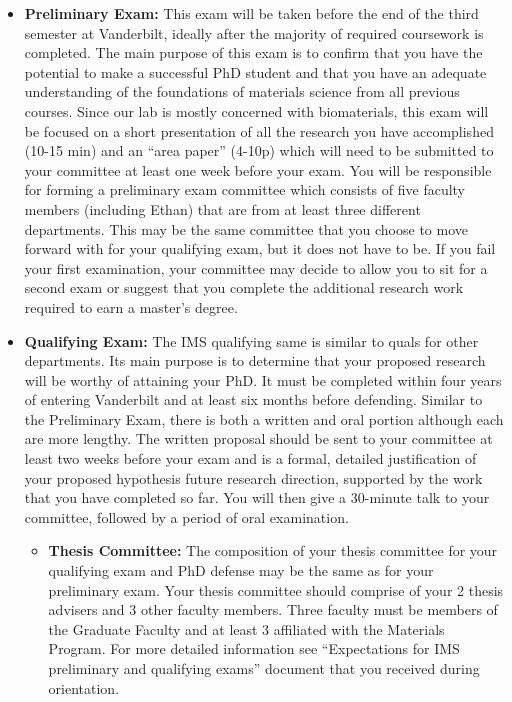 \documentclass[
]{book}
\providecommand{\tightlist}{%
  \setlength{\itemsep}{0pt}\setlength{\parskip}{0pt}}
\begin{document}
\begin{itemize}
\item
  \textbf{Preliminary Exam:} This exam will be taken before the end of the third semester at Vanderbilt, ideally after the majority of required coursework is completed. The main purpose of this exam is to confirm that you have the potential to make a successful PhD student and that you have an adequate understanding of the foundations of materials science from all previous courses. Since our lab is mostly concerned with biomaterials, this exam will be focused on a short presentation of all the research you have accomplished (10-15 min) and an ``area paper'' (4-10p) which will need to be submitted to your committee at least one week before your exam. You will be responsible for forming a preliminary exam committee which consists of five faculty members (including Ethan) that are from at least three different departments. This may be the same committee that you choose to move forward with for your qualifying exam, but it does not have to be. If you fail your first examination, your committee may decide to allow you to sit for a second exam or suggest that you complete the additional research work required to earn a master's degree.
\item
  \textbf{Qualifying Exam:} The IMS qualifying same is similar to quals for other departments. Its main purpose is to determine that your proposed research will be worthy of attaining your PhD. It must be completed within four years of entering Vanderbilt and at least six months before defending. Similar to the Preliminary Exam, there is both a written and oral portion although each are more lengthy. The written proposal should be sent to your committee at least two weeks before your exam and is a formal, detailed justification of your proposed hypothesis future research direction, supported by the work that you have completed so far. You will then give a 30-minute talk to your committee, followed by a period of oral examination.

  \begin{itemize}
  \tightlist
  \item
    \textbf{Thesis Committee:} The composition of your thesis committee for your qualifying exam and PhD defense may be the same as for your preliminary exam. Your thesis committee should comprise of your 2 thesis advisers and 3 other faculty members. Three faculty must be members of the Graduate Faculty and at least 3 affiliated with the Materials Program. For more detailed information see ``Expectations for IMS preliminary and qualifying exams'' document that you received during orientation.
  \end{itemize}
\end{itemize}
\end{document}
